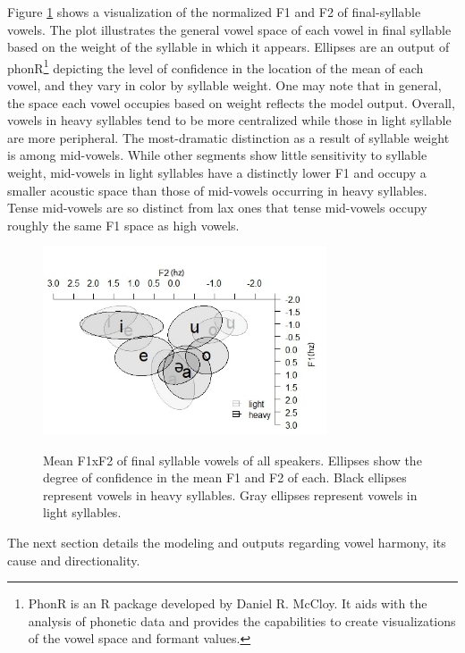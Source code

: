 \documentclass[12pt]{ouparticle}
\begin{document}
\newpage

Figure \ref{fig:ellipses_final} shows a visualization of the normalized F1 and F2 of final-syllable vowels. The plot illustrates the general vowel space of each vowel in final syllable based on the weight of the syllable in which it appears. Ellipses are an output of phonR\footnote{PhonR is an R package developed by Daniel R. McCloy. It aids with the analysis of phonetic data and provides the capabilities to create visualizations of the vowel space and formant values.} \citep{mccloy2016} depicting the level of confidence in the location of the mean of each vowel, and they vary in color by syllable weight. One may note that in general, the space each vowel occupies based on weight reflects the model output. Overall, vowels in heavy syllables tend to be more centralized while those in light syllable are more peripheral. The most-dramatic distinction as a result of syllable weight is among mid-vowels. While other segments show little sensitivity to syllable weight, mid-vowels in light syllables have a distinctly lower F1 and occupy a smaller acoustic space than those of mid-vowels occurring in heavy syllables. Tense mid-vowels are so distinct from lax ones that tense mid-vowels occupy roughly the same F1 space as high vowels.

\begin{figure}[h!]
    \centering
    \caption{Mean F1xF2 of final syllable vowels of all speakers. Ellipses show the degree of confidence in the mean F1 and F2 of each. Black ellipses represent vowels in heavy syllables. Gray ellipses represent vowels in light syllables.}
    \includegraphics[width=0.75\textwidth]{Figure4.jpg}
    \label{fig:ellipses_final}
\end{figure}

\newpage


The next section details the modeling and outputs regarding vowel harmony, its cause and directionality.
\end{document}
